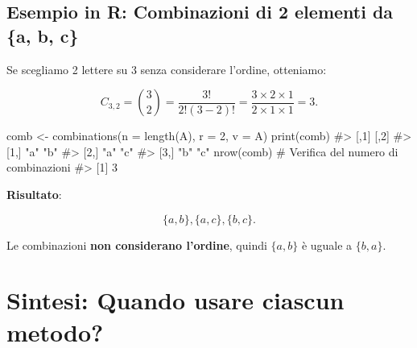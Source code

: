 \documentclass[
  italian,
  letterpaper,
  a4paper,
  11pt,
  open=any]{scrbook}
\newenvironment{Shaded}{\begin{snugshade}}{\end{snugshade}}
\newcommand{\AttributeTok}[1]{\textcolor[rgb]{0.40,0.45,0.13}{#1}}
\newcommand{\CommentTok}[1]{\textcolor[rgb]{0.37,0.37,0.37}{#1}}
\newcommand{\DecValTok}[1]{\textcolor[rgb]{0.68,0.00,0.00}{#1}}
\newcommand{\FunctionTok}[1]{\textcolor[rgb]{0.28,0.35,0.67}{#1}}
\newcommand{\NormalTok}[1]{\textcolor[rgb]{0.00,0.23,0.31}{#1}}
\newcommand{\OtherTok}[1]{\textcolor[rgb]{0.00,0.23,0.31}{#1}}
\theoremstyle{plain}
\theoremstyle{definition}
\theoremstyle{definition}
\theoremstyle{remark}
\begin{document}
\subsection{Esempio in R: Combinazioni di 2 elementi da \{a, b,
c\}}\label{esempio-in-r-combinazioni-di-2-elementi-da-a-b-c}

Se scegliamo 2 lettere su 3 senza considerare l'ordine, otteniamo:

\[
C_{3,2} = \binom{3}{2} = \frac{3!}{2!(3-2)!} = \frac{3 \times 2 \times 1}{2 \times 1 \times 1} = 3.
\]

\begin{Shaded}
\begin{Highlighting}[]
\NormalTok{comb }\OtherTok{\textless{}{-}} \FunctionTok{combinations}\NormalTok{(}\AttributeTok{n =} \FunctionTok{length}\NormalTok{(A), }\AttributeTok{r =} \DecValTok{2}\NormalTok{, }\AttributeTok{v =}\NormalTok{ A)}
\FunctionTok{print}\NormalTok{(comb)}
\CommentTok{\#\textgreater{}      [,1] [,2]}
\CommentTok{\#\textgreater{} [1,] "a"  "b" }
\CommentTok{\#\textgreater{} [2,] "a"  "c" }
\CommentTok{\#\textgreater{} [3,] "b"  "c"}
\FunctionTok{nrow}\NormalTok{(comb)  }\CommentTok{\# Verifica del numero di combinazioni}
\CommentTok{\#\textgreater{} [1] 3}
\end{Highlighting}
\end{Shaded}

\textbf{Risultato}:

\[
\{a, b\}, \{a, c\}, \{b, c\}.
\]

Le combinazioni \textbf{non considerano l'ordine}, quindi \(\{a, b\}\) è
uguale a \(\{b, a\}\).

\section{Sintesi: Quando usare ciascun
metodo?}\label{sintesi-quando-usare-ciascun-metodo}
\end{document}
